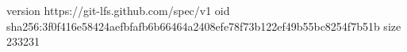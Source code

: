 version https://git-lfs.github.com/spec/v1
oid sha256:3f0f416e58424aefbfafb6b66464a2408efe78f73b122ef49b55bc8254f7b51b
size 233231
